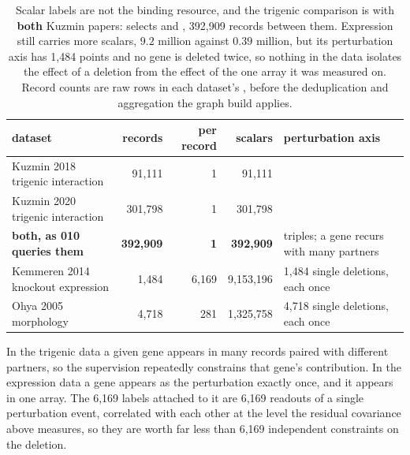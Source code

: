 \begin{table}[htbp]
\centering\small
\begin{tabular}{lrrrp{40mm}}
\toprule
dataset & records & per record & scalars & perturbation axis \\
\midrule
Kuzmin 2018 trigenic interaction  & 91{,}111  & 1 & 91{,}111  & \\
Kuzmin 2020 trigenic interaction  & 301{,}798 & 1 & 301{,}798 & \\
\quad \textbf{both, as 010 queries them} & \textbf{392{,}909} & \textbf{1} & \textbf{392{,}909} & triples; a gene recurs with many partners \\
\midrule
Kemmeren 2014 knockout expression & 1{,}484  & 6{,}169 & 9{,}153{,}196 & 1{,}484 single deletions, each once \\
Ohya 2005 morphology              & 4{,}718  & 281     & 1{,}325{,}758 & 4{,}718 single deletions, each once \\
\bottomrule
\end{tabular}
\caption[]{Scalar labels are not the binding resource, and the trigenic comparison is with
\textbf{both} Kuzmin papers: 
selects  and , 392,909 records
between them. Expression still carries more scalars, $9.2$ million against $0.39$ million,
but its perturbation axis has 1,484 points and no gene is deleted twice, so nothing in the
data isolates the effect of a deletion from the effect of the one array it was measured on.
Record counts are raw rows in each dataset's , before the
deduplication and aggregation the graph build applies.}
\label{tab:label-accounting}
\end{table}

In the trigenic data a given gene appears in many records paired with different partners,
so the supervision repeatedly constrains that gene's contribution. In the expression data a
gene appears as the perturbation exactly once, and it appears in one array. The 6,169 labels attached to it are 6,169
readouts of a single perturbation event, correlated with each other at the level the
residual covariance above measures, so they are worth far less than 6,169 independent
constraints on the deletion.

